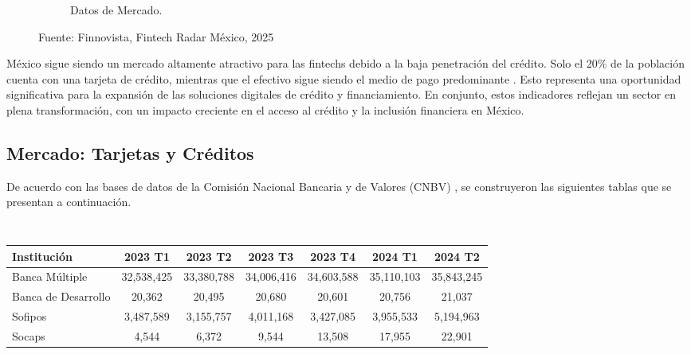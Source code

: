 \begin{figure}[h!]
\begin{subfigure}[b]{0.45\textwidth}
        \caption{Datos de Mercado.}
        \label{fig:datmerca}
    \end{subfigure}
    \caption{Fuente: Finnovista,  Fintech Radar México, 2025}
    \label{fig:figure1}
\end{figure}

México sigue siendo un mercado altamente atractivo para las fintechs debido a la baja penetración del crédito. Solo el 20\% de la población cuenta con una tarjeta de crédito, mientras que el efectivo sigue siendo el medio de pago predominante \cite{elfinanciero2024}. Esto representa una oportunidad significativa para la expansión de las soluciones digitales de crédito y financiamiento. En conjunto, estos indicadores reflejan un sector en plena transformación, con un impacto creciente en el acceso al crédito y la inclusión financiera en México.

\subsection*{Mercado: Tarjetas y Créditos}
De acuerdo con las bases de datos de la Comisión Nacional Bancaria y de Valores (CNBV) \cite{cnbv_inclusion_2024}, se construyeron las siguientes tablas que se presentan a continuación.

\begin{table}[h!]
    \centering
    \caption{\textcolor{white}{Número de tarjetas de crédito por tipo de institución (trimestral)}}
    \color{white}
    \begin{tabular}{lcccccc}
        \hline
        \textbf{Institución} & \textbf{2023 T1} & \textbf{2023 T2} & \textbf{2023 T3} & \textbf{2023 T4} & \textbf{2024 T1} & \textbf{2024 T2} \\
        \hline
        Banca Múltiple       &        32,538,425         &        33,380,788         &       34,006,416          &       34,603,588          &        35,110,103         &        35,843,245    \\
        Banca de Desarrollo  &       20,362         &          20,495       &        20,680         &         20,601        &        20,756         &        21,037        \\
        Sofipos              &     3,487,589         &         3,155,757        &        4,011,168         &        3,427,085         &        3,955,533         &        5,194,963      \\
        Socaps               &       4,544          &           6,372      &       9,544          &         13,508        &        17,955         &            22,901     \\
        \hline
    \end{tabular}
    \label{tab:creditos_trimestrales}
\end{table}

